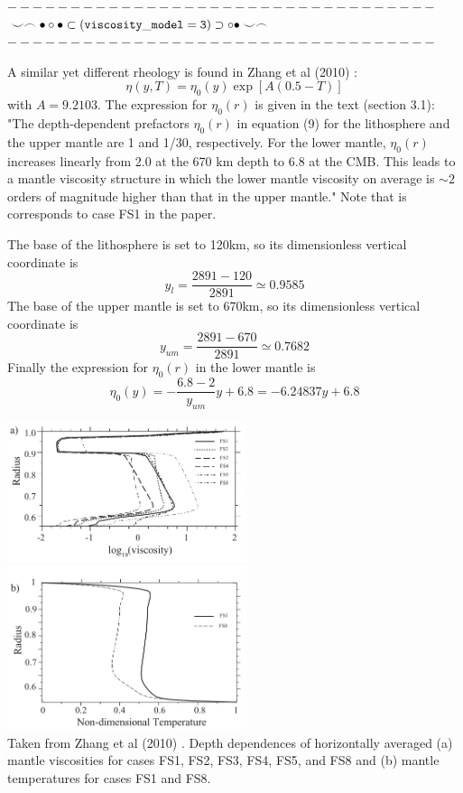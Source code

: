 \begin{center}
$----------------------------------$\\
$\smile \frown \bullet \circ \bullet \subset ( {\tt viscosity\_model=3} ) \supset \circ \bullet \smile \frown$\\
$----------------------------------$
\end{center}


A similar yet different rheology is found in Zhang et al (2010) \cite{zhzl10}:
\[
\eta(y,T) = \eta_0(y) \exp [A(0.5-T)]
\]
with $A=9.2103$. The expression for $\eta_0(r)$ is given in the text (section 3.1):
"The depth‐dependent prefactors $\eta_0(r)$ in equation (9)
for the lithosphere and the upper mantle are 1 and 1/30,
respectively. For the lower mantle, $\eta_0(r)$ increases
linearly from 2.0 at the 670 km depth to 6.8 at the CMB. This
leads to a mantle viscosity structure in which the lower mantle
viscosity on average is $\sim 2$ orders of magnitude higher than
that in the upper mantle." Note that is corresponds to case FS1 in the paper. 

The base of the lithosphere is set to 120km, so its dimensionless
vertical coordinate is 
\[
y_l = \frac{2891-120}{2891} \simeq 0.9585
\] 
The base of the upper mantle is set to 670km, so its dimensionless
vertical coordinate is 
\[
y_{um} = \frac{2891-670}{2891} \simeq 0.7682
\] 
Finally the expression for $\eta_0(r)$ in the lower mantle 
is 
\[
\eta_0(y)= - \frac{6.8-2}{y_{um}} y + 6.8 = -6.24837 y + 6.8
\]

\begin{center}
\includegraphics[width=7cm]{python_codes/fieldstone_88/images/zhzl10a}
\includegraphics[width=7cm]{python_codes/fieldstone_88/images/zhzl10b}\\
{\captionfont Taken from Zhang et al (2010) \cite{zhzl10}.
Depth dependences of horizontally averaged
(a) mantle viscosities for cases FS1, FS2, FS3, FS4, FS5,
and FS8 and (b) mantle temperatures for cases FS1 and FS8.}
\end{center}


 



\vspace{2cm}

